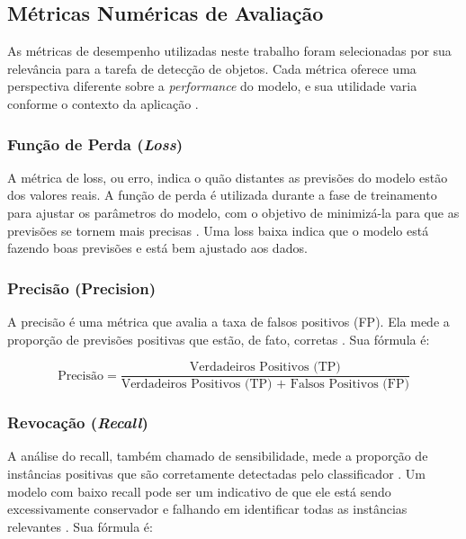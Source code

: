 \subsection{Métricas Numéricas de Avaliação}

As métricas de desempenho utilizadas neste trabalho foram selecionadas por sua relevância
para a tarefa de detecção de objetos. Cada métrica oferece uma perspectiva diferente sobre a
\textit{performance} do modelo, e sua utilidade varia conforme o contexto da aplicação
\cite{geron2023maos}.

\subsubsection{Função de Perda (\textit{Loss})}

A métrica de loss, ou erro, indica o quão distantes as previsões do modelo estão dos valores
reais. A função de perda é utilizada durante a fase de treinamento para ajustar os parâmetros
do modelo, com o objetivo de minimizá-la para que as previsões se tornem mais precisas
\cite{miguel2025uso}. Uma loss baixa indica que o modelo está fazendo boas previsões e está
bem ajustado aos dados.

\subsubsection{Precisão (Precision)}

A precisão é uma métrica que avalia a taxa de falsos positivos (FP). Ela mede a proporção de
previsões positivas que estão, de fato, corretas \cite{miguel2025uso}. Sua fórmula é:

\begin{equation}
\text{Precisão} = \frac{\text{Verdadeiros Positivos (TP)}}{\text{Verdadeiros Positivos (TP) + Falsos Positivos (FP)}}
\end{equation}

\subsubsection{Revocação (\textit{Recall})}

A análise do recall, também chamado de sensibilidade, mede a proporção de instâncias positivas
que são corretamente detectadas pelo classificador \cite{geron2023maos}. Um modelo com baixo
recall pode ser um indicativo de que ele está sendo excessivamente conservador e falhando em
identificar todas as instâncias relevantes \cite{goodfellow2016deep}. Sua fórmula é:

